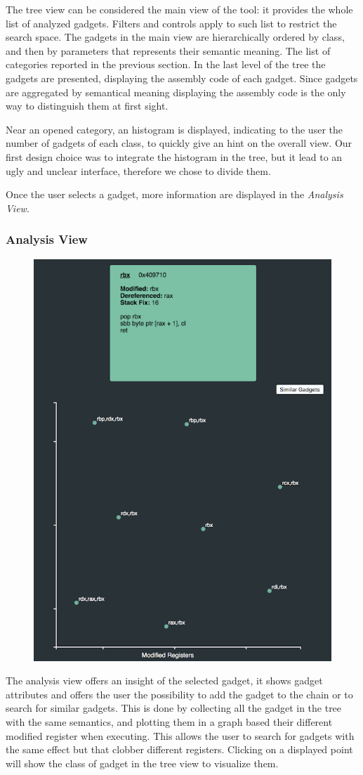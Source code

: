 \documentclass[twocolumn, 11pt]{article}
\begin{document}
The tree view can be considered the main view of the tool: it provides the whole list of analyzed gadgets. Filters and controls apply to such list to restrict the search space. The gadgets in the main view are hierarchically ordered by class, and then by parameters that represents their semantic meaning. The list of categories reported in the previous section. In the last level of the tree the gadgets are presented, displaying the assembly code of each gadget. Since gadgets are aggregated by semantical meaning displaying the assembly code is the only way to distinguish them at first sight.

Near an opened category, an histogram is displayed, indicating to the user the number of gadgets of each class, to quickly give an hint on the overall view. Our first design choice was to integrate the histogram in the tree, but it lead to an ugly and unclear interface, therefore we chose to divide them.

Once the user selects a gadget, more information are displayed in the \textit{Analysis View}.

\subsubsection{Analysis View}
\begin{figure}[htb]
  \centering
  \includegraphics[width=0.6\linewidth]{analysis-view}
\end{figure}

The analysis view offers an insight of the selected gadget, it shows gadget attributes and offers the user the possibility to add the gadget to the chain or to search for similar gadgets. This is done by collecting all the gadget in the tree with the same semantics, and plotting them in a graph based their different modified register when executing. This allows the user to search for gadgets with the same effect but that clobber different registers. Clicking on a displayed point will show the class of gadget in the tree view to visualize them.
\end{document}
